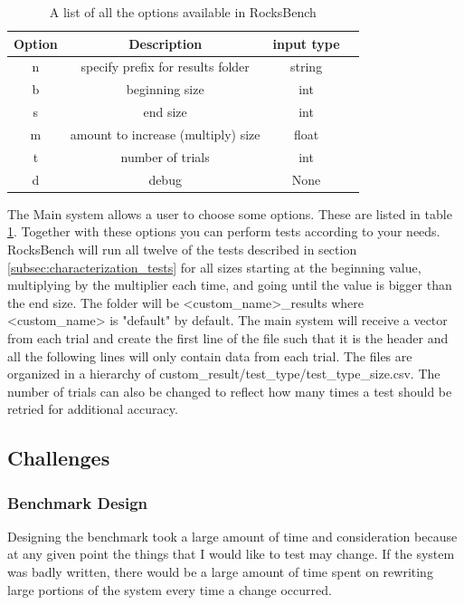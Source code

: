 \documentclass[twocolumn,11pt]{article}
\begin{document}
\begin{table}[h!]
  \begin{tabular}{ |c|c|c|c| }
    \hline
    Option & Description & input type \\
    \hline \hline
    n & specify prefix for results folder & string \\ \hline
    b & beginning size & int \\ \hline
    s & end size & int \\ \hline
    m & amount to increase (multiply) size & float \\ \hline
    t & number of trials & int \\ \hline
    d & debug & None \\ \hline
  \end{tabular}
  \caption{A list of all the options available in RocksBench}
  \label{tab:RocksBench_options}
\end{table}

The Main system allows a user to choose some options. These are listed in table
\ref{tab:RocksBench_options}. Together with these options you can perform tests
according to your needs. RocksBench will run all twelve of the tests described
in section \ref{subsec:characterization_tests} for all sizes starting at the
beginning value, multiplying by the multiplier each time, and going until the
value is bigger than the end size. The folder will be <custom\_name>\_results
where <custom\_name> is "default" by default. The main system will receive a
vector from each trial and create the first line of the file such that it is the
header and all the following lines will only contain data from each trial. The
files are organized in a hierarchy of
custom\_result/test\_type/test\_type\_size.csv. The number of trials can also be
changed to reflect how many times a test should be retried for additional
accuracy.

\subsection{Challenges}

\subsubsection{Benchmark Design}

Designing the benchmark took a large amount of time and consideration because at
any given point the things that I would like to test may change. If the system
was badly written, there would be a large amount of time spent on rewriting
large portions of the system every time a change occurred.
\end{document}
